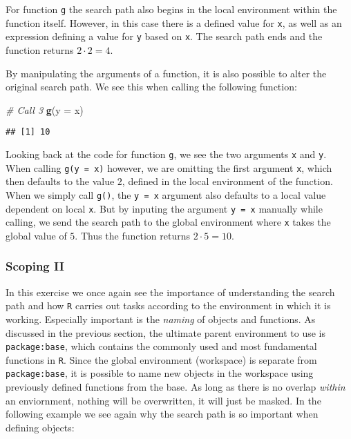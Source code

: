 \documentclass[11,]{article}
\newenvironment{Shaded}{\begin{snugshade}}{\end{snugshade}}
\newcommand{\KeywordTok}[1]{\textcolor[rgb]{0.13,0.29,0.53}{\textbf{{#1}}}}
\newcommand{\DataTypeTok}[1]{\textcolor[rgb]{0.13,0.29,0.53}{{#1}}}
\newcommand{\CommentTok}[1]{\textcolor[rgb]{0.56,0.35,0.01}{\textit{{#1}}}}
\newcommand{\NormalTok}[1]{{#1}}
\begin{document}
For function \texttt{g} the search path also begins in the local
environment within the function itself. However, in this case there is a
defined value for \texttt{x}, as well as an expression defining a value
for \texttt{y} based on \texttt{x}. The search path ends and the
function returns \(2 \cdot 2=4\).

By manipulating the arguments of a function, it is also possible to
alter the original search path. We see this when calling the following
function:

\begin{Shaded}
\begin{Highlighting}[]
\CommentTok{# Call 3}
\KeywordTok{g}\NormalTok{(}\DataTypeTok{y =} \NormalTok{x)}
\end{Highlighting}
\end{Shaded}

\begin{verbatim}
## [1] 10
\end{verbatim}

Looking back at the code for function \texttt{g}, we see the two
arguments \texttt{x} and \texttt{y}. When calling \texttt{g(y\ =\ x)}
however, we are omitting the first argument \texttt{x}, which then
defaults to the value \(2\), defined in the local environment of the
function.\\
When we simply call \texttt{g()}, the \texttt{y\ =\ x} argument also
defaults to a local value dependent on local \texttt{x}. But by inputing
the argument \texttt{y\ =\ x} manually while calling, we send the search
path to the global environment where \texttt{x} takes the global value
of \(5\). Thus the function returns \(2 \cdot 5=10\).

\subsubsection{Scoping II}\label{scoping-ii}

In this exercise we once again see the importance of understanding the
search path and how \texttt{R} carries out tasks according to the
environment in which it is working. Especially important is the
\emph{naming} of objects and functions. As discussed in the previous
section, the ultimate parent environment to use is
\texttt{package:base}, which contains the commonly used and most
fundamental functions in \texttt{R}. Since the global environment
(workspace) is separate from \texttt{package:base}, it is possible to
name new objects in the workspace using previously defined functions
from the base. As long as there is no overlap \emph{within} an
enviornment, nothing will be overwritten, it will just be masked. In the
following example we see again why the search path is so important when
defining objects:
\end{document}

